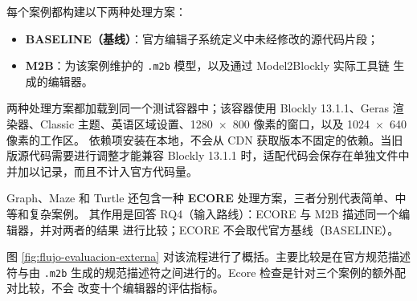 每个案例都构建以下两种处理方案：

\begin{itemize}
  \item \textbf{BASELINE（基线）}：官方编辑子系统定义中未经修改的源代码片段；
  \item \textbf{M2B}：为该案例维护的 \texttt{.m2b} 模型，以及通过 Model2Blockly 实际工具链
  生成的编辑器。
\end{itemize}

两种处理方案都加载到同一个测试容器中；该容器使用 Blockly 13.1.1、Geras 渲染器、Classic
主题、英语区域设置、1280~$\times$~800 像素的窗口，以及 1024~$\times$~640 像素的工作区。
依赖项安装在本地，不会从 CDN 获取版本不固定的依赖。当旧版源代码需要进行调整才能兼容
Blockly 13.1.1 时，适配代码会保存在单独文件中并加以记录，而且不计入官方代码量。

Graph、Maze 和 Turtle 还包含一种 \textbf{ECORE} 处理方案，三者分别代表简单、中等和复杂案例。
其作用是回答 RQ4（输入路线）：ECORE 与 M2B 描述同一个编辑器，并对两者的结果
进行比较；ECORE 不会取代官方基线（BASELINE）。

图 \ref{fig:flujo-evaluacion-externa} 对该流程进行了概括。主要比较是在官方规范描述符与由
\texttt{.m2b} 生成的规范描述符之间进行的。Ecore 检查是针对三个案例的额外配对比较，不会
改变十个编辑器的评估指标。

